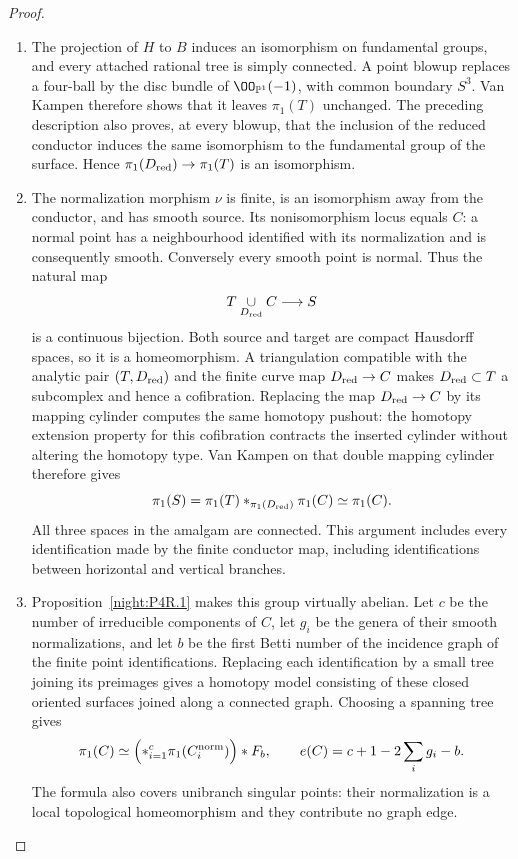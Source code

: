 \begin{proof}
\begin{enumerate}[label={$\langle1\rangle$\arabic*.},leftmargin=*]
\item The projection of $H$ to $B$ induces an isomorphism on
fundamental groups, and every attached rational tree
is simply connected. A point blowup replaces a four-ball by the disc bundle
of $\OO_{\mathbb P^1}(-1)$, with common boundary $S^3$.
Van Kampen therefore shows that it leaves $\pi_1(T)$ unchanged. The preceding
description also proves, at every blowup, that the
inclusion of the reduced conductor induces the same
isomorphism to the fundamental group of the surface.
Hence $\pi_1(D_{\rm red})\to\pi_1(T)$ is an
isomorphism.

\item The normalization morphism $\nu$ is finite, is an
isomorphism away from the conductor, and has smooth
source. Its nonisomorphism locus equals $C$: a normal
point has a neighbourhood identified with its
normalization and is consequently smooth. Conversely
every smooth point is normal. Thus the natural map
\[
 T\underset{D_{\rm red}}{\cup}C\longrightarrow S
\]
is a continuous bijection. Both source and target are
compact Hausdorff spaces, so it is a homeomorphism.
A triangulation compatible with the analytic pair $(T,D_{\rm red})$
and the finite curve map $D_{\rm red}\to C$ makes
$D_{\rm red}\subset T$ a subcomplex and hence a
cofibration. Replacing the map $D_{\rm red}\to C$ by
its mapping cylinder computes the same homotopy
pushout: the homotopy extension property for this
cofibration contracts the inserted cylinder without
altering the homotopy type. Van Kampen on that double
mapping cylinder therefore gives
\[
 \pi_1(S)=\pi_1(T)
       *_{\pi_1(D_{\rm red})}\pi_1(C)
       \simeq\pi_1(C).
\]
All three spaces in the amalgam are connected. This
argument includes every identification made by the
finite conductor map, including identifications
between horizontal and vertical branches.

\item Proposition~\ref{night:P4R.1} makes this group virtually abelian. Let $c$ be
the number of irreducible components of $C$, let
$g_i$ be the genera of their smooth normalizations,
and let $b$ be the first Betti number of the incidence
graph of the finite point identifications. Replacing
each identification by a small tree joining its
preimages gives a homotopy model consisting of these
closed oriented surfaces joined along a connected
graph. Choosing a spanning tree gives
\[
 \pi_1(C)\simeq
   \Bigl(*_{i=1}^{c}\pi_1(C_i^{\rm norm})\Bigr)*F_b,
 \qquad
 e(C)=c+1-2\sum_i g_i-b.
\]
The formula also covers unibranch singular points:
their normalization is a local topological
homeomorphism and they contribute no graph edge.


\end{enumerate}
\end{proof}
